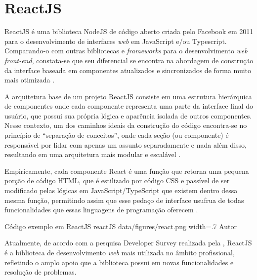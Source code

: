 \section{ReactJS}
\label{sec:reactJS}
ReactJS é uma biblioteca NodeJS de código aberto criada pelo Facebook em 2011 para o desenvolvimento de interfaces \textit{web} em JavaScript e/ou Typescript. Comparando-o com outras bibliotecas e \textit{frameworks} para o desenvolvimento \textit{web front-end}, constata-se que seu diferencial se encontra na abordagem de construção da interface baseada em componentes atualizados e sincronizados de forma muito mais otimizada \cite{Source2023}.

A arquitetura base de um projeto ReactJS consiste em uma estrutura hierárquica de componentes onde cada componente representa uma parte da interface final do usuário, que possui sua própria lógica e aparência isolada de outros componentes. Nesse contexto, um dos caminhos ideais da construção do código encontra-se no princípio de “separação de conceitos”, onde cada seção (ou componente) é responsável por lidar com apenas um assunto separadamente e nada além disso, resultando em uma arquitetura mais modular e escalável \cite{Qawwas2022}.

Empiricamente, cada componente React é uma função que retorna uma pequena porção de código HTML, que é estilizado por código CSS e passível de ser modificado pelas lógicas em JavaScript/TypeScript que existem dentro dessa mesma função, permitindo assim que esse pedaço de interface usufrua de todas funcionalidades que essas linguagens de programação oferecem \cite{Qawwas2022}.

\image
    {Código exemplo em ReactJS}
    {reactJS}
    {data/figures/react.png}
    {width=.7\textwidth}
    {Autor}

Atualmente, de acordo com a pesquisa Developer Survey realizada pela , ReactJS é a biblioteca de desenvolvimento \textit{web} mais utilizada no âmbito profissional, refletindo o amplo apoio que a biblioteca possui em novas funcionalidades e resolução de problemas.